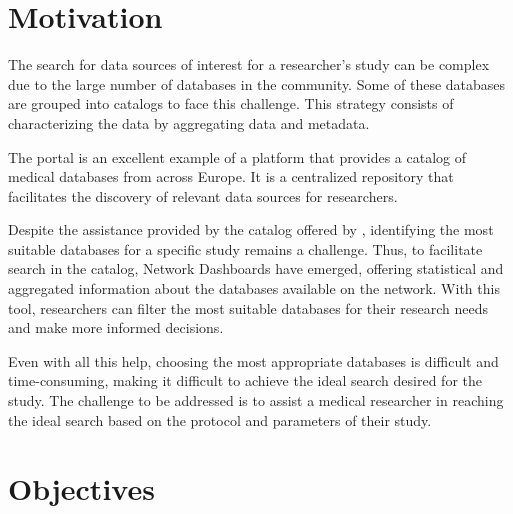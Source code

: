 \section{Motivation}

The search for data sources of interest for a researcher's study can be complex due to the large number of databases in the community. Some of these databases are grouped into catalogs to face this challenge. This strategy consists of characterizing the data by aggregating data and metadata.

The {\ehden} portal is an excellent example of a platform that provides a catalog of medical databases from across Europe. It is a centralized repository that facilitates the discovery of relevant data sources for researchers.

Despite the assistance provided by the catalog offered by {\ehden}, identifying the most suitable databases for a specific study remains a challenge. Thus, to facilitate search in the catalog, Network Dashboards have emerged, offering statistical and aggregated information about the databases available on the {\ehden} network. With this tool, researchers can filter the most suitable databases for their research needs and make more informed decisions.

Even with all this help, choosing the most appropriate databases is difficult and time-consuming, making it difficult to achieve the ideal search desired for the study. The challenge to be addressed is to assist a medical researcher in reaching the ideal search based on the protocol and parameters of their study.


\section{Objectives}



